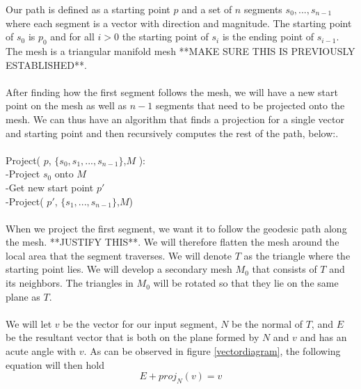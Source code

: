 \documentclass[conference]{acmsiggraph}
\begin{document}
Our path is defined as a starting point $p$ and a set of $n$ segments $s_0,...,s_{n-1}$ where each segment is a vector with direction and magnitude. The starting point of $s_0$ is $p_0$ and for all $i>0$ the starting point of $s_i$ is the ending point of $s_{i-1}$. The mesh is a triangular manifold mesh **MAKE SURE THIS IS PREVIOUSLY ESTABLISHED**. \\
\\
After finding how the first segment follows the mesh, we will have a new start point on the mesh as well as $n-1$ segments that need to be projected onto the mesh. We can thus have an algorithm that finds a projection for a single vector and starting point and then recursively computes the rest of the path, below:.\\
\\
Project( $p$, $\{s_0,s_1,...,s_{n-1}\}$,$M$ ):\\
-Project $s_0$ onto $M$\\
-Get new start point $p'$\\
-Project( $p'$, $\{s_1,...,s_{n-1}\}$,$M$)\\ 
\\
When we project the first segment, we want it to follow the geodesic path along the mesh. **JUSTIFY THIS**. We will therefore flatten the mesh around the local area that the segment traverses. We will denote $T$ as the triangle where the starting point lies. We will develop a secondary mesh $M_0$ that consists of $T$ and its neighbors. The triangles in $M_0$ will be rotated so that they lie on the same plane as $T$. \\
\\
We will let $v$ be the vector for our input segment, $N$ be the normal of $T$, and $E$ be the resultant vector that is both on the plane formed by $N$ and $v$ and has an acute angle with $v$. As can be observed in figure \ref{vectordiagram}, the following equation will then hold
\[
E + proj_N(v) = v
\]
\end{document}
